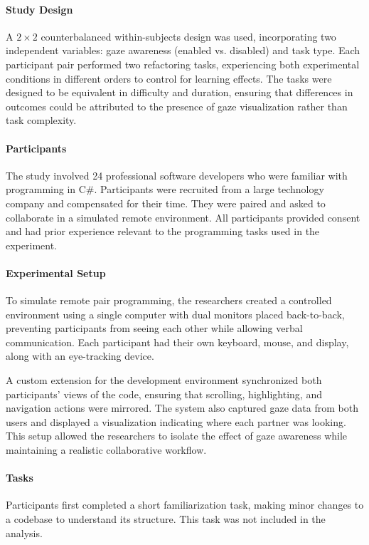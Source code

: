 \paragraph{Study Design}
A $2 \times 2$ counterbalanced within-subjects design was used, incorporating two independent variables: gaze awareness (enabled vs. disabled) and task type. Each participant pair performed two refactoring tasks, experiencing both experimental conditions in different orders to control for learning effects. The tasks were designed to be equivalent in difficulty and duration, ensuring that differences in outcomes could be attributed to the presence of gaze visualization rather than task complexity.

\paragraph{Participants}
The study involved 24 professional software developers who were familiar with programming in C\#. Participants were recruited from a large technology company and compensated for their time. They were paired and asked to collaborate in a simulated remote environment. All participants provided consent and had prior experience relevant to the programming tasks used in the experiment.

\paragraph{Experimental Setup}
To simulate remote pair programming, the researchers created a controlled environment using a single computer with dual monitors placed back-to-back, preventing participants from seeing each other while allowing verbal communication. Each participant had their own keyboard, mouse, and display, along with an eye-tracking device.

A custom extension for the development environment synchronized both participants’ views of the code, ensuring that scrolling, highlighting, and navigation actions were mirrored. The system also captured gaze data from both users and displayed a visualization indicating where each partner was looking. This setup allowed the researchers to isolate the effect of gaze awareness while maintaining a realistic collaborative workflow.

\paragraph{Tasks}
Participants first completed a short familiarization task, making minor changes to a codebase to understand its structure. This task was not included in the analysis.

